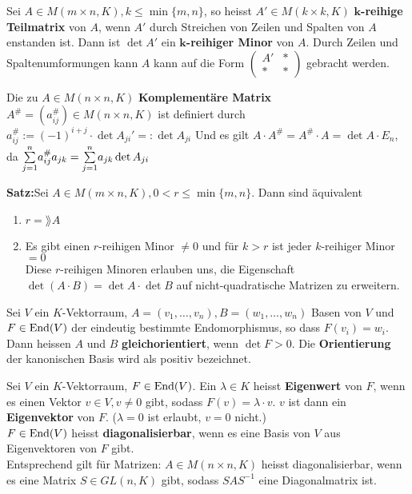 \begin{mdframed}
Sei $A \in M(m\times n,K), k \leq \min\{m,n\}$, so heisst $A' \in M(k\times k,K)$ $\mathbf{k}$\textbf{-reihige Teilmatrix} von $A$, wenn $A'$ durch Streichen von Zeilen und Spalten von $A$ enstanden ist. Dann ist $\det A'$ ein $\mathbf{k}$\textbf{-reihiger Minor} von $A$. Durch Zeilen und Spaltenumformungen kann $A$ kann auf die Form $\begin{pmatrix}
    A' & * \\ * & *
\end{pmatrix}$ gebracht werden.
\end{mdframed}
\begin{mdframed}
Die zu $A \in M(n\times n,K)$ \textbf{Komplementäre Matrix} $A^{\#} = \left(a_{ij}^{\#}\right) \in M(n\times n,K)$ ist definiert durch\\
$a_{ij}^{\#} := (-1)^{i+j} \cdot \det A_{ji}' =: \det A_{ji}$ \quad 
Und es gilt $A \cdot A^{\#} = A^{\#} \cdot A = \det A \cdot E_n$, da $\underset{j=1}{\overset{n}{\sum}}a_{ij}^{\#}a_{jk} = \underset{j = 1}{\overset{n}{\sum}}a_{jk}\det A_{ji}$
\end{mdframed}
\textbf{Satz:}\quad Sei $A \in M(m\times n,K), 0 < r \leq \min\{m,n\}$. Dann sind äquivalent
\begin{enumerate}[{(}i{)}]
    \item $r = \rang A$
    
    \item Es gibt einen $r$-reihigen Minor $\neq 0$ und für $k > r$ ist jeder $k$-reihiger Minor $= 0$\\
    Diese $r$-reihigen Minoren erlauben uns, die Eigenschaft $\det(A \cdot B) = \det A \cdot \det B$ auf nicht-quadratische Matrizen zu erweitern.
\end{enumerate}
\vspace{-5pt}
\begin{mdframed}
Sei $V$ ein $K$-Vektorraum, $A = (v_1, \ldots, v_n), B = (w_1, \ldots, w_n)$ Basen von $V$ und $F \in \text{End}(V)$ der eindeutig bestimmte Endomorphismus, so dass $F(v_i) = w_i$.\\
Dann heissen $A$ und $B$ \textbf{gleichorientiert}, wenn $\det F > 0$. Die \textbf{Orientierung} der kanonischen Basis wird als positiv bezeichnet.
\end{mdframed}
\vspace{-5pt}
\begin{mdframed}
Sei $V$ ein $K$-Vektorraum, $F \in \text{End}(V)$. Ein $\lambda \in K$ heisst \textbf{Eigenwert} von $F$, wenn es einen Vektor $v \in V, v \neq 0$ gibt, sodass $F(v) = \lambda \cdot v$. $v$ ist dann ein \textbf{Eigenvektor} von $F$. ($\lambda = 0$ ist erlaubt, $v = 0$ nicht.)\\
$F \in \text{End}(V)$ heisst \textbf{diagonalisierbar}, wenn es eine Basis von $V$ aus Eigenvektoren von $F$ gibt. \\
Entsprechend gilt für Matrizen: $A \in M(n\times n,K)$ heisst diagonalisierbar, wenn es eine Matrix $S \in GL(n,K)$ gibt, sodass $S A {S}^{-1}$ eine Diagonalmatrix ist.
\end{mdframed}

